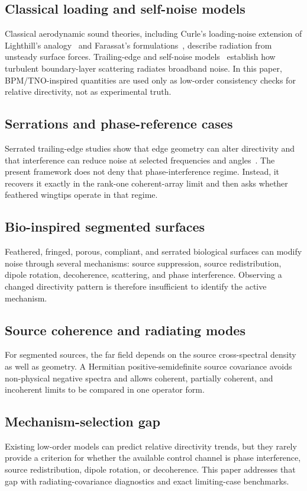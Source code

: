 \documentclass[11pt]{article}
\begin{document}
\subsection{Classical loading and self-noise models}
Classical aerodynamic sound theories, including Curle's loading-noise extension of Lighthill's analogy~\cite{Curle1955} and Farassat's formulations~\cite{Farassat2007}, describe radiation from unsteady surface forces. Trailing-edge and self-noise models~\cite{Amiet1976,Howe1978,Brooks1989} establish how turbulent boundary-layer scattering radiates broadband noise. In this paper, BPM/TNO-inspired quantities are used only as low-order consistency checks for relative directivity, not as experimental truth.

\subsection{Serrations and phase-reference cases}
Serrated trailing-edge studies show that edge geometry can alter directivity and that interference can reduce noise at selected frequencies and angles~\cite{Lyu2016SerratedTE}. The present framework does not deny that phase-interference regime. Instead, it recovers it exactly in the rank-one coherent-array limit and then asks whether feathered wingtips operate in that regime.

\subsection{Bio-inspired segmented surfaces}
Feathered, fringed, porous, compliant, and serrated biological surfaces can modify noise through several mechanisms: source suppression, source redistribution, dipole rotation, decoherence, scattering, and phase interference. Observing a changed directivity pattern is therefore insufficient to identify the active mechanism.

\subsection{Source coherence and radiating modes}
For segmented sources, the far field depends on the source cross-spectral density as well as geometry. A Hermitian positive-semidefinite source covariance avoids non-physical negative spectra and allows coherent, partially coherent, and incoherent limits to be compared in one operator form.

\subsection{Mechanism-selection gap}
Existing low-order models can predict relative directivity trends, but they rarely provide a criterion for whether the available control channel is phase interference, source redistribution, dipole rotation, or decoherence. This paper addresses that gap with radiating-covariance diagnostics and exact limiting-case benchmarks.
\end{document}
